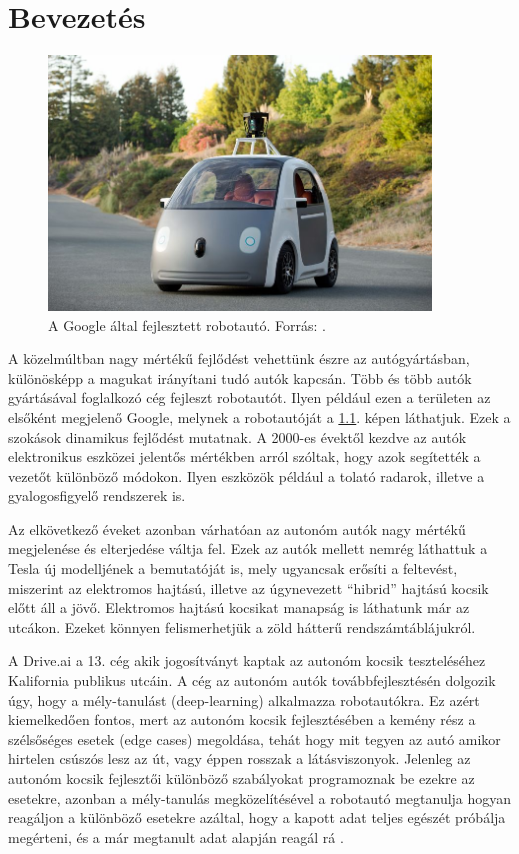 \documentclass[a4paper,12pt]{report}
\begin{document}
\chapter{Bevezetés}

\begin{figure}[ht]
\centerline{
\includegraphics[width=4in]{img/googleauto}}
\caption{A Google által fejlesztett robotautó. Forrás: \cite{googlecarimage}.}
\label{googleauto}
\end{figure}

A közelmúltban nagy mértékű fejlődést vehettünk észre az autógyártásban, különösképp a magukat irányítani tudó autók kapcsán. Több és több autók gyártásával foglalkozó cég fejleszt robotautót. Ilyen például ezen a területen az elsőként megjelenő Google, melynek a robotautóját a \ref{googleauto}. képen láthatjuk. Ezek a szokások dinamikus fejlődést mutatnak. A 2000-es évektől kezdve az autók elektronikus eszközei jelentős mértékben arról szóltak, hogy azok segítették a vezetőt különböző módokon. Ilyen eszközök például a tolató radarok, illetve a gyalogosfigyelő rendszerek is. 

\vspace{2mm}
Az elkövetkező éveket azonban várhatóan az autonóm autók nagy mértékű megjelenése és elterjedése váltja fel. Ezek az autók mellett nemrég láthattuk a Tesla új modelljének a bemutatóját is, mely ugyancsak erősíti a feltevést, miszerint az elektromos hajtású, illetve az úgynevezett ``hibrid'' hajtású kocsik előtt áll a jövő. Elektromos hajtású kocsikat manapság is láthatunk már az utcákon. Ezeket könnyen felismerhetjük a zöld hátterű rendszámtáblájukról.

\vspace{2mm}
A Drive.ai a 13. cég akik jogosítványt kaptak az autonóm kocsik teszteléséhez Kalifornia publikus utcáin. A cég az autonóm autók továbbfejlesztésén dolgozik úgy, hogy a mély-tanulást (deep-learning) alkalmazza robotautókra. Ez azért kiemelkedően fontos, mert az autonóm kocsik fejlesztésében a kemény rész a szélsőséges esetek (edge cases) megoldása, tehát hogy mit tegyen az autó amikor hirtelen csúszós lesz az út, vagy éppen rosszak a látásviszonyok. Jelenleg az autonóm kocsik fejlesztői különböző szabályokat programoznak be ezekre az esetekre, azonban a mély-tanulás megközelítésével a robotautó megtanulja hogyan reagáljon a különböző esetekre azáltal, hogy a kapott adat teljes egészét próbálja megérteni, és a már megtanult adat alapján reagál rá \cite{driveai}.
\end{document}
